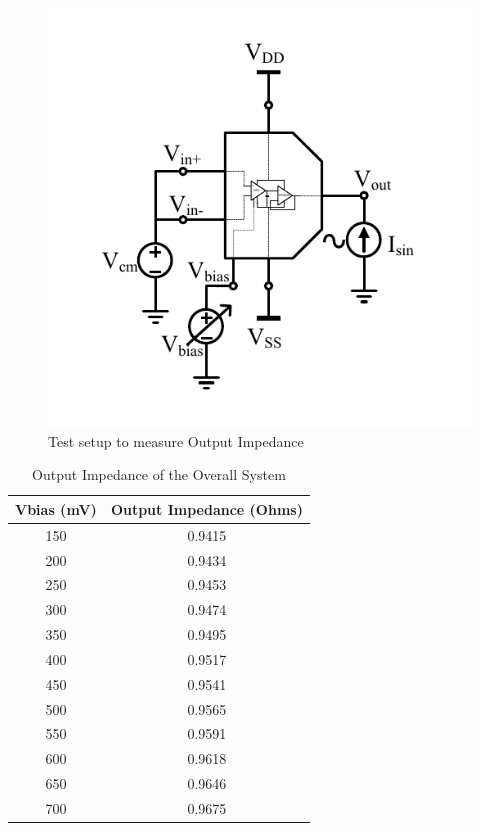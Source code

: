 \begin{figure} [H]
\centering
\includegraphics[scale=1]{Figures/Test_Benches/Overall/ZOUT.pdf}
\caption{Test setup to measure Output Impedance}
\label{fig:TB_ZOUT}
\end{figure}

\begin{table} [H]
\centering
\begin{tabular}{@{}cc@{}}
\toprule
Vbias (mV)			& Output Impedance (Ohms)	\\ \midrule
150					& 0.9415 \\
200					& 0.9434 \\
250					& 0.9453 \\
300					& 0.9474 \\
350					& 0.9495 \\
400					& 0.9517 \\
450					& 0.9541 \\
500					& 0.9565 \\
550					& 0.9591 \\
600					& 0.9618 \\
650					& 0.9646 \\
700 				& 0.9675 \\
\bottomrule
\end{tabular}
\caption{Output Impedance of the Overall System}
\label{tab:ZOUT}
\end{table}

